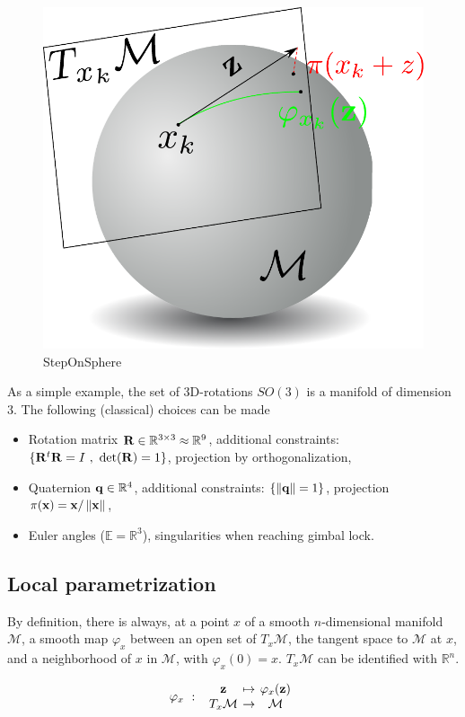 \begin{figure}[htpb]
  \centering
  \includegraphics[width=0.5\linewidth]{Humanoids2015/stepOnSphere.pdf}
  \caption{StepOnSphere}
  \label{fig:stepOnSphere}
\end{figure}

As a simple example, the set of 3D-rotations $SO(3)$ is a manifold of dimension $3$.
The following (classical) choices can be made
\begin{itemize}
  \item Rotation matrix ${\bf R} \in \mathbb{R}^{3\times 3} \approx \mathbb{R}^9$, additional constraints: $\{{\bf R}^t{\bf R} = I\ ,\ \det({\bf R})=1\}$, projection by orthogonalization,
  \item Quaternion ${\bf q} \in \mathbb{R}^4$, additional constraints: $\{ \left\|{\bf q}\right\|=1\}$, projection $\pi({\bf x}) = {\bf x}/\left\|{\bf x}\right\|$,
  \item Euler angles ($\mathbb{E} = \mathbb{R}^3$), singularities when reaching gimbal lock.
\end{itemize}


\subsection{Local parametrization}
By definition, there is always, at a point $x$ of a smooth $n$-dimensional manifold $\mathcal{M}$, a smooth map $\varphi_x$ between an open set of $T_x\mathcal{M}$, the tangent space to $\mathcal{M}$ at $x$, and a neighborhood of $x$ in $\mathcal{M}$, with $\varphi_x(0) = x$.
$T_x\mathcal{M}$ can be identified with $\mathbb{R}^n$.

\begin{equation}
  \varphi_x\ :\
  \begin{array}{ccc}
    \mathbf{z} & \reduce{\mapsto}{6} & \varphi_x(\mathbf{z}) \\
    T_x\mathcal{M} & \reduce{\rightarrow}{6} & \mathcal{M}
  \end{array} \nonumber
\end{equation}

